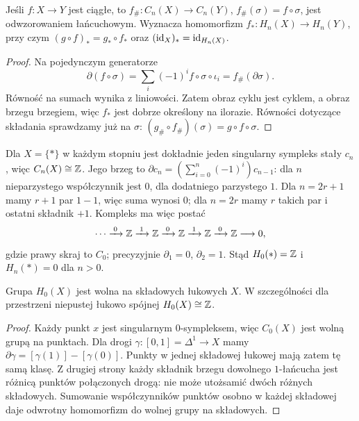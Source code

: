\begin{stwierdzenie}
\label{prop:funktor-singularny}
Jeśli $f:X\to Y$ jest ciągłe, to
$f_\#:C_n(X)\to C_n(Y)$,
$f_\#(\sigma)=f\circ\sigma$,
jest odwzorowaniem łańcuchowym. Wyznacza homomorfizm
$f_*:H_n(X)\to H_n(Y)$, przy czym
$(g\circ f)_*=g_*\circ f_*$ oraz
$(\mathrm{id}_X)_*=\mathrm{id}_{H_n(X)}$.
\end{stwierdzenie}
\begin{proof}
Na pojedynczym generatorze
\[
 \partial(f\circ\sigma)
 =\sum_i(-1)^i f\circ\sigma\circ\iota_i
 =f_\#(\partial\sigma).
\]
Równość na sumach wynika z liniowości.
Zatem obraz cyklu jest cyklem, a obraz
brzegu brzegiem, więc $f_*$ jest
dobrze określony na ilorazie.
Równości dotyczące składania sprawdzamy
już na $\sigma$:
$(g_\#\circ f_\#)(\sigma)=g\circ f\circ\sigma$.
\end{proof}

\begin{przyklad}[Punkt]
\label{prz:homologia-punktu}
Dla $X=\{*\}$ w każdym stopniu jest
dokładnie jeden singularny sympleks
stały $c_n$, więc $C_n(X)\cong\mathbb{Z}$.
Jego brzeg to
$\partial c_n=(\sum_{i=0}^n(-1)^i)c_{n-1}$:
dla $n$ nieparzystego współczynnik
jest $0$, dla dodatniego parzystego $1$.
Dla $n=2r+1$ mamy $r+1$ par $1-1$, więc suma wynosi $0$;
dla $n=2r$ mamy $r$ takich par i ostatni składnik $+1$.
Kompleks ma więc postać
\[
 \cdots\xrightarrow{\;0\;}\mathbb{Z}
 \xrightarrow{\;1\;}\mathbb{Z}
 \xrightarrow{\;0\;}\mathbb{Z}
 \xrightarrow{\;1\;}\mathbb{Z}
 \xrightarrow{\;0\;}\mathbb{Z}\longrightarrow0,
\]
gdzie prawy skraj to $C_0$; precyzyjnie
$\partial_1=0$, $\partial_2=1$.
Stąd $H_0(*)=\mathbb{Z}$ i $H_n(*)=0$ dla $n>0$.
\end{przyklad}

\begin{stwierdzenie}
\label{prop:h0-singularne}
Grupa $H_0(X)$ jest wolna na składowych
łukowych $X$. W szczególności
dla przestrzeni niepustej łukowo spójnej
$H_0(X)\cong\mathbb{Z}$.
\end{stwierdzenie}
\begin{proof}
Każdy punkt $x$ jest singularnym
$0$-sympleksem, więc $C_0(X)$
jest wolną grupą na punktach.
Dla drogi $\gamma:[0,1]=\Delta^1\to X$
mamy $\partial\gamma=[\gamma(1)]-
[\gamma(0)]$. Punkty w jednej składowej
łukowej mają zatem tę samą klasę.
Z drugiej strony każdy składnik
brzegu dowolnego $1$-łańcucha
jest różnicą punktów połączonych drogą:
nie może utożsamić dwóch różnych
składowych. Sumowanie współczynników
punktów osobno w każdej składowej
daje odwrotny homomorfizm do
wolnej grupy na składowych.
\end{proof}

